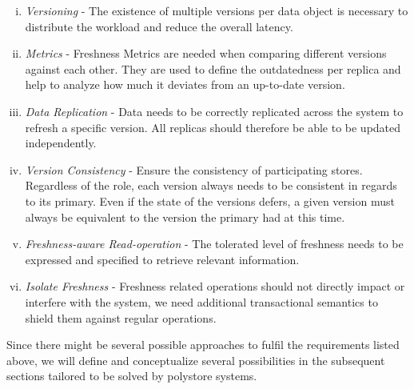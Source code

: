 \begin{enumerate}[(i)]
    \item \textit{Versioning} -                     The existence of multiple versions per data object is necessary to distribute the workload 
                                                    and reduce the overall latency.

    \item \textit{Metrics} -                        Freshness Metrics are needed when comparing different versions against each other.
                                                    They are used to define the outdatedness per replica and help to analyze how much it deviates from an up-to-date version.

    \item \textit{Data Replication} -               Data needs to be correctly replicated across the system to refresh a specific version.
                                                    All replicas should therefore be able to be updated independently.

    \item \textit{Version Consistency} -            Ensure the consistency of participating stores. Regardless of the role, each version always needs 
                                                    to be consistent in regards to its primary. Even if the state of the versions defers, 
                                                    a given version must always be equivalent to the version the primary had at this time.
                                            
    \item \textit{Freshness-aware Read-operation} - The tolerated level of freshness needs to be expressed and specified to retrieve relevant information.
    
    \item \textit{Isolate Freshness} -              Freshness related operations should not directly impact or interfere with the system, 
                                                    we need additional transactional semantics to shield them against regular operations.                                    

\end{enumerate}

Since there might be several possible approaches to fulfil the requirements listed above, 
we will define and conceptualize several possibilities in the subsequent sections tailored to be solved by polystore systems. 


